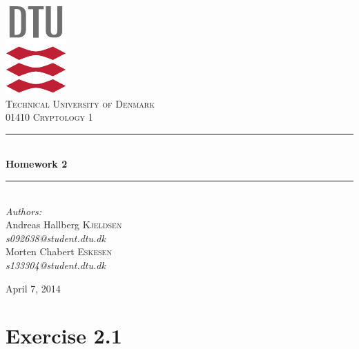 \documentclass[11pt]{report}
\newcommand{\HRule}{\rule{\linewidth}{0.5mm}}
\begin{document}
\begin{titlepage}
\begin{center}

\includegraphics[scale=2.0]{../GFX/dtu_logo.pdf}\\[1cm]
\textsc{\LARGE Technical University of Denmark}\\[1.5cm]
\textsc{\Large 01410 Cryptology 1}\\[0.5cm]

\HRule \\[0.4cm]
{\huge \bfseries Homework 2}\\[0.1cm]
\HRule \\[1.5cm]

{\large
\emph{Authors:} \\[10pt]
Andreas Hallberg \textsc{Kjeldsen}\\
\emph{s092638@student.dtu.dk} \\[10pt]
Morten Chabert \textsc{Eskesen}\\
\emph{s133304@student.dtu.dk}
}
\vfill

{\large April 7, 2014}

\end{center}
\end{titlepage}

\section*{Exercise 2.1}
\end{document}

